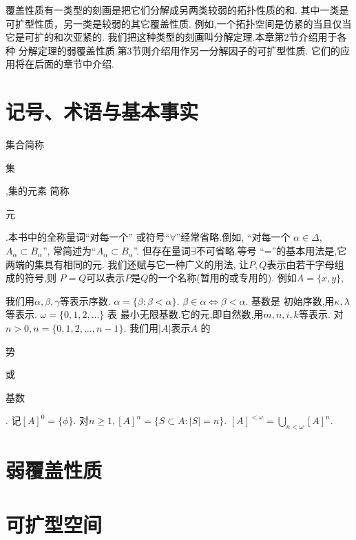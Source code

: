 \documentclass[main.tex]{subfiles}
\begin{document}
	
	覆盖性质有一类型的刻画是把它们分解成另两类较弱的拓扑性质的和.
	其中一类是可扩型性质，另一类是较弱的其它覆盖性质.
	例如,一个拓扑空间是仿紧的当且仅当它是可扩的和次亚紧的.
	我们把这种类型的刻画叫分解定理.本章第2节介绍用于各种
	分解定理的弱覆盖性质.第3节则介绍用作另一分解因子的可扩型性质.
	它们的应用将在后面的章节中介绍.
	
	
	\section{记号、术语与基本事实}
	集合简称\begin{kaishu}集\end{kaishu},集的元素
	简称\begin{kaishu}元\end{kaishu}.本书中的全称量词“对每一个”
	或符号“$\forall$”经常省略.倒如, “对每一个
	$\alpha\in\Delta$, $A_\alpha \subset B_\alpha$”,
	常简述为“$A_\alpha \subset B_\alpha$”.
	但存在量词$\exists$不可省略.等号
	“=”的基本用法是,它两端的集具有相同的元.
	我们还赋与它一种广义的用法, 让$P, Q$表示由若干字母组成的符号,则
	$P=Q$可以表示$P$是$Q$的一个名称(暂用的或专用的).
	例如$A=\{x,y\}$,
	
	我们用$\alpha, \beta, \gamma$等表示序数. $\alpha = \{\beta: \beta < \alpha\}$. $\beta \in \alpha \Leftrightarrow\beta<\alpha$. 基数是
	初始序数,用$\kappa,\lambda$ 等表示. $\omega = \{0, 1, 2, \dots\}$ 表
	最小无限基数.它的元,即自然数,用$m, n, i , k$等表示.
	对$n>0, n = \{0,1,2, \dots, n-1\}$. 我们用$|A|$表示$A$ 
	的\begin{kaishu}势\end{kaishu}或\begin{kaishu}基数\end{kaishu}.
	记$[A]^0=\{\phi\}$. 对$n\ge1, [A]^n = \{S\subset A: |S| = n\}$.
	$[A]^{<\omega} = \bigcup_{n<\omega}[A]^n$.
	
	\section{弱覆盖性质}
	\section{可扩型空间}
	
\end{document}
